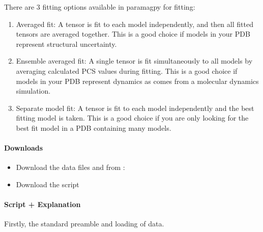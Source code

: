 \documentclass[a4paper,10pt,english,openany,oneside]{sphinxmanual}
\begin{document}
There are 3 fitting options available in paramagpy for fitting:
\begin{enumerate}
\def\theenumi{\arabic{enumi}}
\def\labelenumi{\theenumi .}
\makeatletter\def\p@enumii{\p@enumi \theenumi .}\makeatother
\item {} 
Averaged fit: A tensor is fit to each model independently, and then all fitted tensors are averaged together. This is a good choice if models in your PDB represent structural uncertainty.

\item {} 
Ensemble averaged fit: A single tensor is fit simultaneously to all models by averaging calculated PCS values during fitting. This is a good choice if models in your PDB represent dynamics as comes from a molecular dynamics simulation.

\item {} 
Separate model fit: A tensor is fit to each model independently and the best fitting model is taken. This is a good choice if you are only looking for the best fit model in a PDB containing many models.

\end{enumerate}


\paragraph{Downloads}
\label{\detokenize{examples/pcs_fit_models:downloads}}\begin{itemize}
\item {} 
Download the data files  and  from :

\item {} 
Download the script 

\end{itemize}


\paragraph{Script + Explanation}
\label{\detokenize{examples/pcs_fit_models:script-explanation}}
Firstly, the standard preamble and loading of data.
\end{document}
